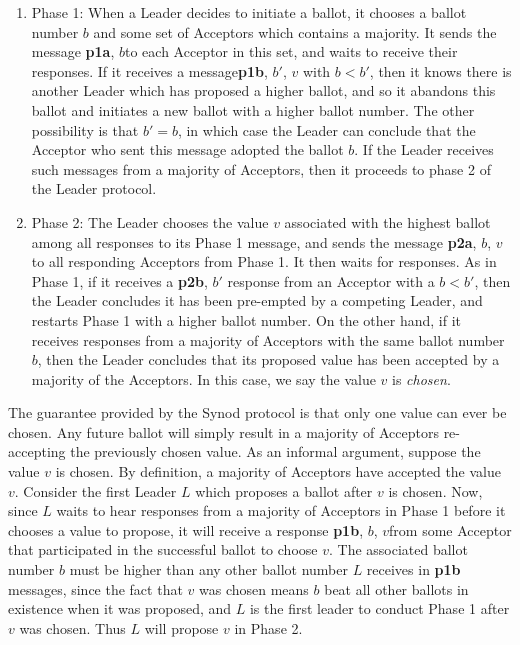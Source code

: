 \documentclass{sig-alternate}
\begin{document}
\begin{enumerate}
	\item Phase 1: When a Leader decides to initiate a ballot, it chooses a ballot number $b$ and some set of Acceptors which contains a majority. It sends the message \textlangle \textbf{p1a}, $b$\textrangle to each Acceptor in this set, and waits to receive their responses. If it receives a message\textlangle \textbf{p1b}, $b'$, $v$ \textrangle with $b < b'$, then it knows there is another Leader which has proposed a higher ballot, and so it abandons this ballot and initiates a new ballot with a higher ballot number.
	The other possibility is that $b' = b$, in which case the Leader can conclude that the Acceptor who sent this message adopted the ballot $b$. If the Leader receives such messages from a majority of Acceptors, then it proceeds to phase 2 of the Leader protocol.
	
	\item Phase 2: The Leader chooses the value $v$ associated with the highest ballot among all responses to its Phase 1 message, and sends the message \textlangle \textbf{p2a}, $b$, $v$ \textrangle to all responding Acceptors from Phase 1. It then waits for responses.
	As in Phase 1, if it receives a \textlangle \textbf{p2b}, $b'$ \textrangle response from an Acceptor with a $b < b'$, then the Leader concludes it has been pre-empted by a competing Leader, and restarts Phase 1 with a higher ballot number.
	On the other hand, if it receives responses from a majority of Acceptors with the same ballot number $b$, then the Leader concludes that its proposed value has been accepted by a majority of the Acceptors. In this case, we say the value $v$ is \textit{chosen}.
\end{enumerate}

The guarantee provided by the Synod protocol is that only one value can ever be chosen. Any future ballot will simply result in a majority of Acceptors re-accepting the previously chosen value. As an informal argument, suppose the value $v$ is chosen. By definition, a majority of Acceptors have accepted the value $v$. Consider the first Leader $L$ which proposes a ballot after $v$ is chosen. Now, since $L$ waits to hear responses from a majority of Acceptors in Phase 1 before it chooses a value to propose, it will receive a response \textlangle \textbf{p1b}, $b$, $v$\textrangle from some Acceptor that participated in the successful ballot to choose $v$. The associated ballot number $b$ must be higher than any other ballot number $L$ receives in \textbf{p1b} messages, since the fact that $v$ was chosen means $b$ beat all other ballots in existence when it was proposed, and $L$ is the first leader to conduct Phase 1 after $v$ was chosen. Thus $L$ will propose $v$ in Phase 2.
\end{document}
